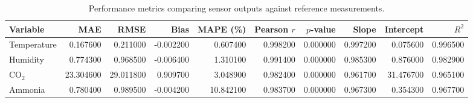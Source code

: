 \begin{table}
\caption{Performance metrics comparing sensor outputs against reference measurements.}
\label{tab:performance_metrics}
\begin{tabular}{lrrrrrrrrr}
\toprule
Variable & MAE & RMSE & Bias & MAPE (\%) & Pearson $r$ & $p$-value & Slope & Intercept & $R^2$ \\
\midrule
Temperature & 0.167600 & 0.211000 & -0.002200 & 0.607400 & 0.998200 & 0.000000 & 0.997200 & 0.075600 & 0.996500 \\
Humidity & 0.774300 & 0.968500 & -0.006400 & 1.310100 & 0.991400 & 0.000000 & 0.985300 & 0.876000 & 0.982900 \\
CO$_2$ & 23.304600 & 29.011800 & 0.909700 & 3.048900 & 0.982400 & 0.000000 & 0.961700 & 31.476700 & 0.965100 \\
Ammonia & 0.780400 & 0.989500 & -0.004200 & 10.842100 & 0.983700 & 0.000000 & 0.967300 & 0.354300 & 0.967700 \\
\bottomrule
\end{tabular}
\end{table}
